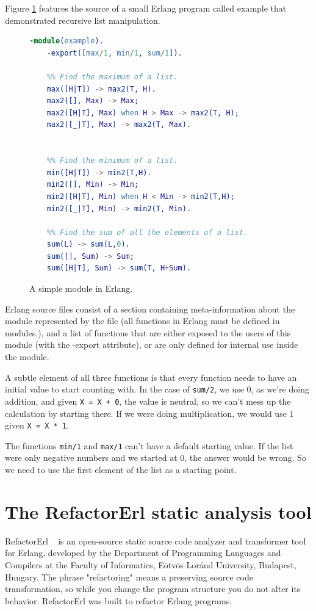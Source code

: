 Figure \ref{fig:example_erlang} features the source of a small Erlang program
called example that demonstrated recursive list manipulation.
\begin{figure}[h]
	\begin{lstlisting}[extendedchars=true, language=Erlang, basicstyle=\footnotesize\ttfamily, keywordstyle=\color{red}]
	-module(example). 
	-export([max/1, min/1, sum/1]).
	
	%% Find the maximum of a list.
	max([H|T]) -> max2(T, H).
	max2([], Max) -> Max;
	max2([H|T], Max) when H > Max -> max2(T, H);
	max2([_|T], Max) -> max2(T, Max).
	

	%% Find the minimum of a list.
	min([H|T]) -> min2(T,H).
	min2([], Min) -> Min;
	min2([H|T], Min) when H < Min -> min2(T,H);
	min2([_|T], Min) -> min2(T, Min).
	
	%% Find the sum of all the elements of a list.
	sum(L) -> sum(L,0).
	sum([], Sum) -> Sum;
	sum([H|T], Sum) -> sum(T, H+Sum).
	\end{lstlisting}
\caption{A simple module in Erlang.}
\label{fig:example_erlang}
\end{figure}

Erlang source files consist of a section containing meta-information about the module represented by the file (all functions in Erlang must be defined in
modules.), and a list of functions that are either exposed to the users of this module (with the -export attribute), or are only defined for internal use inside the module.  

A subtle element of all three functions is that every function needs to have an initial value to start counting with. In the case of \texttt{sum/2}, we use 0, as we’re doing addition, and given \texttt{X = X + 0}, the value is neutral, so we can’t mess up the calculation by starting there. If we were doing multiplication, we would use 1 given \texttt{X = X * 1}. 

The functions \texttt{min/1} and \texttt{max/1} can’t have a default starting value. If the list were only negative numbers and we started at 0, the answer would be wrong. So we need to use the first element of the list as a starting point.

\section{The RefactorErl static analysis tool} 

RefactorErl ~\cite{refactorerl1, refactorerl2} is an open-source static source code analyzer and transformer tool for Erlang, developed by the Department of Programming Languages and Compilers at the Faculty of Informatics, Eötvös Loránd University, Budapest, Hungary. The phrase "refactoring" means a preserving source code transformation, so while you change the program structure you do not alter its behavior. RefactorErl was built to refactor Erlang programs.

